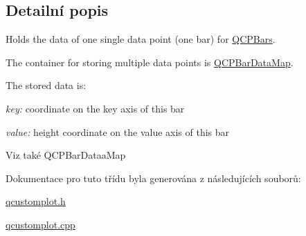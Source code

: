 \subsection{Detailní popis}
Holds the data of one single data point (one bar) for \hyperlink{classQCPBars}{Q\+C\+P\+Bars}. 

The container for storing multiple data points is \hyperlink{qcustomplot_8h_aa846c77472cae93def9f1609d0c57191}{Q\+C\+P\+Bar\+Data\+Map}.

The stored data is\+: \begin{DoxyItemize}
\item {\itshape key\+:} coordinate on the key axis of this bar \item {\itshape value\+:} height coordinate on the value axis of this bar\end{DoxyItemize}
\begin{DoxySeeAlso}{Viz také}
Q\+C\+P\+Bar\+Dataa\+Map 
\end{DoxySeeAlso}


Dokumentace pro tuto třídu byla generována z následujících souborů\+:\begin{DoxyCompactItemize}
\item 
\hyperlink{qcustomplot_8h}{qcustomplot.\+h}\item 
\hyperlink{qcustomplot_8cpp}{qcustomplot.\+cpp}\end{DoxyCompactItemize}
